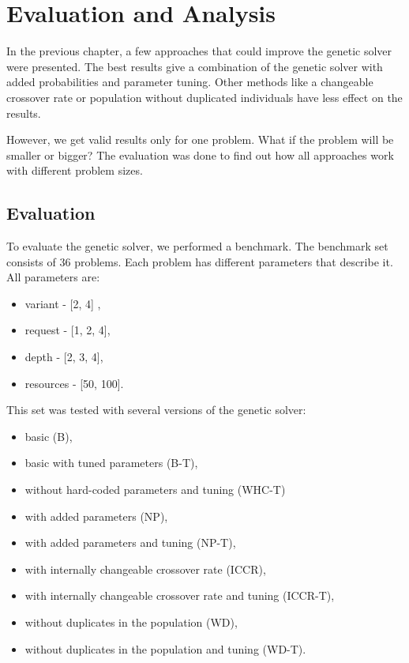 \chapter{Evaluation and Analysis}

In the previous chapter, a few approaches that could improve the genetic solver were presented.
The best results give a combination of the genetic solver with added probabilities and parameter tuning.
Other methods like a changeable crossover rate or population without duplicated individuals have less effect on the results.

However, we get valid results only for one problem. What if the problem will be smaller or bigger?
The evaluation was done to find out how all approaches work with different problem sizes. 

\section{Evaluation}
\label{sec:evaluation}

To evaluate the genetic solver, we performed a benchmark. The benchmark set consists of 36 problems. Each problem has different parameters that describe it.
All parameters are:

\begin{itemize}
	\item variant - [2, 4] ,
	\item request - [1, 2, 4],
	\item depth - [2, 3, 4],
	\item resources - [50, 100].
\end{itemize}

This set was tested with several versions of the genetic solver:

\begin{itemize}
	\item basic (B),
	\item basic with tuned parameters (B-T),
	\item without hard-coded parameters and tuning (WHC-T) 
	\item with added parameters (NP),
	\item with added parameters and tuning (NP-T),
	\item with internally changeable crossover rate (ICCR),
	\item with internally changeable crossover rate and tuning (ICCR-T),
	\item without duplicates in the population (WD),
	\item without duplicates in the population and tuning (WD-T).
\end{itemize}

